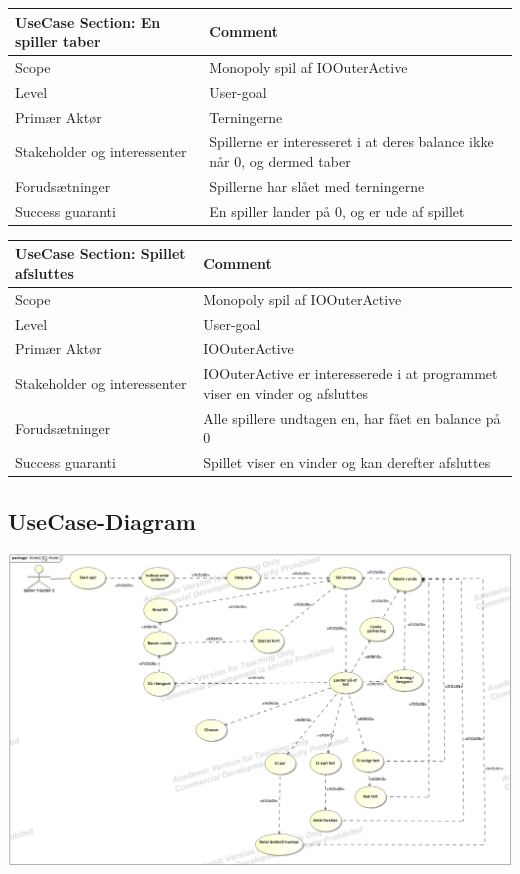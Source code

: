 \begin{center}
\begin{tabular}{ | m{10em} | m{10cm}| }
        \hline
            UseCase Section: En spiller taber & Comment\\
        \hline
            Scope & Monopoly spil af IOOuterActive\\
        \hline
            Level & User-goal\\
        \hline
            Primær Aktør & Terningerne\\
        \hline
            Stakeholder og interessenter & Spillerne er interesseret i at deres balance ikke når 0, og dermed taber\\
        \hline
            Forudsætninger & Spillerne har slået med terningerne\\
        \hline
            Success guaranti & En spiller lander på 0, og er ude af spillet\\
        \hline
    \end{tabular}
\end{center}

\begin{center}
\begin{tabular}{ | m{10em} | m{10cm}| }
        \hline
            UseCase Section: Spillet afsluttes & Comment\\
        \hline
            Scope & Monopoly spil af IOOuterActive\\
        \hline
            Level & User-goal\\
        \hline
            Primær Aktør & IOOuterActive\\
        \hline
            Stakeholder og interessenter & IOOuterActive er interesserede i at programmet viser en vinder og afsluttes\\
        \hline
            Forudsætninger & Alle spillere undtagen en, har fået en balance på 0\\
        \hline
            Success guaranti &Spillet viser en vinder og kan derefter afsluttes\\
        \hline
    \end{tabular}
\end{center}
\subsection{UseCase-Diagram}
\includegraphics[scale=0.8]{fig/dtu/UC-cdio3.jpg}

